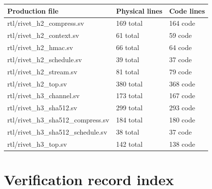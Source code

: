 \documentclass[11pt,a4paper]{article}
\begin{document}
{\small\renewcommand{\arraystretch}{1.18}\begin{longtable}{@{}L{0.55\textwidth}|L{0.18\textwidth}|L{0.18\textwidth}@{}}\toprule

\textbf{Production file} & \textbf{Physical lines} & \textbf{Code lines}\\\midrule\endhead

rtl/\allowbreak{}rivet\_\allowbreak{}h2\_\allowbreak{}compress.sv & 169 total & 164 code\\[2pt]\hline

rtl/\allowbreak{}rivet\_\allowbreak{}h2\_\allowbreak{}context.sv & 61 total & 59 code\\[2pt]\hline

rtl/\allowbreak{}rivet\_\allowbreak{}h2\_\allowbreak{}hmac.sv & 66 total & 64 code\\[2pt]\hline

rtl/\allowbreak{}rivet\_\allowbreak{}h2\_\allowbreak{}schedule.sv & 39 total & 37 code\\[2pt]\hline

rtl/\allowbreak{}rivet\_\allowbreak{}h2\_\allowbreak{}stream.sv & 81 total & 79 code\\[2pt]\hline

rtl/\allowbreak{}rivet\_\allowbreak{}h2\_\allowbreak{}top.sv & 380 total & 368 code\\[2pt]\hline

rtl/\allowbreak{}rivet\_\allowbreak{}h3\_\allowbreak{}channel.sv & 173 total & 167 code\\[2pt]\hline

rtl/\allowbreak{}rivet\_\allowbreak{}h3\_\allowbreak{}sha512.sv & 299 total & 293 code\\[2pt]\hline

rtl/\allowbreak{}rivet\_\allowbreak{}h3\_\allowbreak{}sha512\_\allowbreak{}compress.sv & 184 total & 180 code\\[2pt]\hline

rtl/\allowbreak{}rivet\_\allowbreak{}h3\_\allowbreak{}sha512\_\allowbreak{}schedule.sv & 38 total & 37 code\\[2pt]\hline

rtl/\allowbreak{}rivet\_\allowbreak{}h3\_\allowbreak{}top.sv & 142 total & 138 code\\[2pt]\hline

\bottomrule\end{longtable}}

\section{Verification record index}
\end{document}

